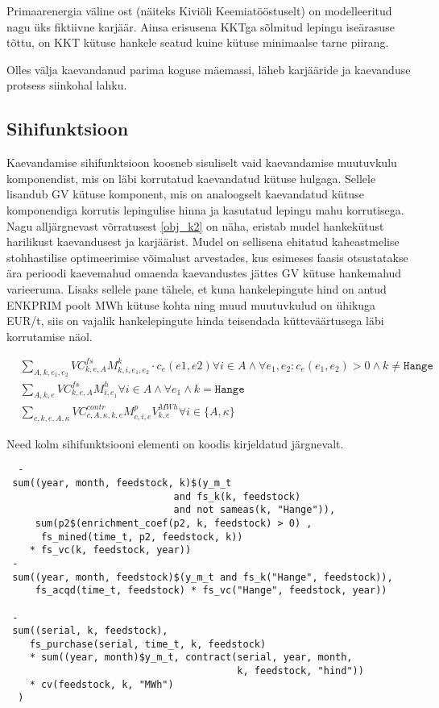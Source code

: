 \documentclass[10pt,a4paper]{article}
\begin{document}
Primaarenergia väline ost (näiteks Kiviõli Keemiatööstuselt) on modelleeritud nagu üks fiktiivne karjäär. Ainsa erisusena KKTga sõlmitud lepingu iseära\-suse tõttu, on KKT kütuse hankele seatud kuine kütuse minimaalse tarne piirang. 

Olles välja kaevandanud parima koguse mäemassi, läheb karjääride ja kaevanduse protsess siinkohal lahku.

\subsection{Sihifunktsioon}
Kaevandamise sihifunktsioon koosneb sisuliselt vaid kaevandamise muutuvkulu komponendist, mis on läbi korrutatud kaevandatud kütuse hulgaga. Sellele lisandub GV kütuse komponent, mis on analoogselt kaevandatud kütuse komponendiga korrutis lepingulise hinna ja kasutatud lepingu mahu korrutisega. Nagu alljärgnevast võrratusest \ref{obj_k2} on näha, eristab mudel hankekütust harilikust kaevandusest ja karjäärist. Mudel on sellisena ehitatud kaheastmelise stohhastilise optimeerimise võimalust arvestades, kus esimeses faasis otsustatakse ära perioodi kaevemahud omaenda kaevandustes jättes GV kütuse hankemahud varieeruma. Lisaks sellele pane tähele, et kuna hankelepingute hind on antud ENKPRIM poolt MWh kütuse kohta ning muud muutuvkulud on ühikuga EUR/t, siis on vajalik hankelepingute hinda teisendada kütteväärtusega läbi korrutamise näol.

\begin{align}
&\sum_{A,k,e_1,e_2} VC^{fs}_{k, e, A} M^k_{k,i,e_1, e_2} \cdot c_e(e1, e2)  \forall i \in A \land \forall e_1, e_2 : c_e(e_1, e_2)>0 \land k \neq \texttt{Hange } \label{obj_k1} \\
&\sum_{A,k,e} VC^{fs}_{k, e, A} M^h_{i,e_1}  \forall i \in A \land \forall e_1 \land k = \texttt{Hange } \label{obj_k2}\\
&\sum_{c, k, e, A, \kappa} VC^{contr}_{c, A, \kappa, k, e} M^p_{c,i,e} V^{MWh}_{k,e}  \forall i \in \{A, \kappa\} \label{obj_k3}
\end{align}

Need kolm sihifunktsiooni elementi on koodis kirjeldatud järgnevalt.
\begin{verbatim}
  -
 sum((year, month, feedstock, k)$(y_m_t
                             and fs_k(k, feedstock)
                             and not sameas(k, "Hange")),
     sum(p2$(enrichment_coef(p2, k, feedstock) > 0) ,
      fs_mined(time_t, p2, feedstock, k))
    * fs_vc(k, feedstock, year))
 -
 sum((year, month, feedstock)$(y_m_t and fs_k("Hange", feedstock)),
     fs_acqd(time_t, feedstock) * fs_vc("Hange", feedstock, year))

 -
 sum((serial, k, feedstock),
    fs_purchase(serial, time_t, k, feedstock)
    * sum((year, month)$y_m_t, contract(serial, year, month, 
                                        k, feedstock, "hind"))
    * cv(feedstock, k, "MWh")
  )
\end{verbatim}
\end{document}
